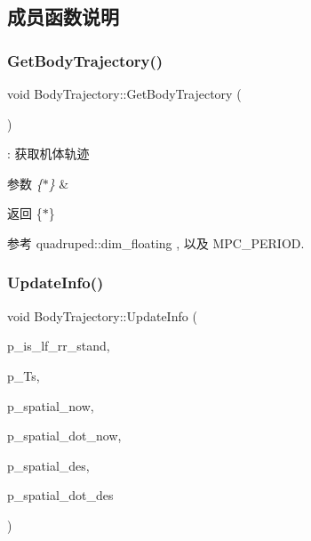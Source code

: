 \subsection{成员函数说明}
\mbox{\label{classquadruped_1_1BodyTrajectory_ae7dfc17baf5ea44b346b3ee7bc7c2cea}} 
\subsubsection{\texorpdfstring{Get\+Body\+Trajectory()}{GetBodyTrajectory()}}
{\footnotesize\ttfamily void Body\+Trajectory\+::\+Get\+Body\+Trajectory (\begin{DoxyParamCaption}\item[{void}]{ }\end{DoxyParamCaption})}

\+: 获取机体轨迹 
\begin{DoxyParams}{参数}
{\em \{$\ast$\}} & \\
\hline
\end{DoxyParams}
\begin{DoxyReturn}{返回}
\{$\ast$\} 
\end{DoxyReturn}


参考 quadruped\+::dim\+\_\+floating , 以及 M\+P\+C\+\_\+\+P\+E\+R\+I\+OD.

\mbox{\label{classquadruped_1_1BodyTrajectory_a633b42ab0022c3cedeb719287e9ae9b2}} 
\subsubsection{\texorpdfstring{Update\+Info()}{UpdateInfo()}}
{\footnotesize\ttfamily void Body\+Trajectory\+::\+Update\+Info (\begin{DoxyParamCaption}\item[{bool}]{p\+\_\+is\+\_\+lf\+\_\+rr\+\_\+stand,  }\item[{double}]{p\+\_\+\+Ts,  }\item[{\hyperlink{cppTypes_8h_a27bb8a600520708a5928332e4e52a92e}{Vec6}$<$ double $>$}]{p\+\_\+spatial\+\_\+now,  }\item[{\hyperlink{cppTypes_8h_a27bb8a600520708a5928332e4e52a92e}{Vec6}$<$ double $>$}]{p\+\_\+spatial\+\_\+dot\+\_\+now,  }\item[{\hyperlink{cppTypes_8h_a27bb8a600520708a5928332e4e52a92e}{Vec6}$<$ double $>$}]{p\+\_\+spatial\+\_\+des,  }\item[{\hyperlink{cppTypes_8h_a27bb8a600520708a5928332e4e52a92e}{Vec6}$<$ double $>$}]{p\+\_\+spatial\+\_\+dot\+\_\+des }\end{DoxyParamCaption})}

